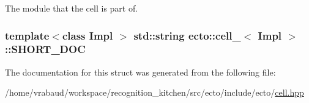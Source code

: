 The module that the cell is part of. 

\subsubsection[{\texorpdfstring{S\+H\+O\+R\+T\+\_\+\+D\+OC}{SHORT_DOC}}]{\setlength{\rightskip}{0pt plus 5cm}template$<$class Impl $>$ std\+::string {\bf ecto\+::cell\+\_\+}$<$ Impl $>$\+::S\+H\+O\+R\+T\+\_\+\+D\+OC\hspace{0.3cm}{\ttfamily [static]}}\hypertarget{structecto_1_1cell___a6a5b6bd083a48acd35ffcf83dacff2f1}{}\label{structecto_1_1cell___a6a5b6bd083a48acd35ffcf83dacff2f1}


The documentation for this struct was generated from the following file\+:\begin{DoxyCompactItemize}
\item 
/home/vrabaud/workspace/recognition\+\_\+kitchen/src/ecto/include/ecto/\hyperlink{cell_8hpp}{cell.\+hpp}\end{DoxyCompactItemize}
